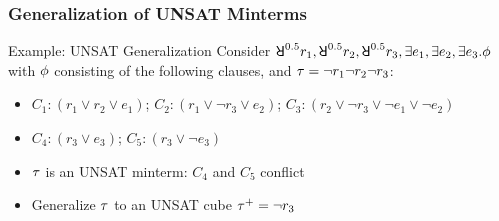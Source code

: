 \begin{frame}
    \frametitle{Generalization of UNSAT Minterms}
    \begin{block}{Example: UNSAT Generalization}
        Consider $\random{0.5}r_1,\random{0.5}r_2,\random{0.5}r_3,\exists e_1,\exists e_2,\exists e_3.\pf$ with $\phi$ consisting of the following clauses, and $\tau=\lnot r_1\lnot r_2\lnot r_3$:
        \begin{itemize}
            \item[] $C_1: (r_1 \lor r_2 \lor e_1)$; $C_2: (r_1 \lor \lnot r_3 \lor e_2)$; $C_3: (r_2 \lor \lnot r_3 \lor \lnot e_1 \lor \lnot e_2)$
            \item[] $C_4: (r_3 \lor e_3)$; $C_5: (r_3 \lor \lnot e_3)$
                  \pause
        \end{itemize}
        \begin{itemize}
            \item $\tau$ is an UNSAT minterm: $C_4$ and $C_5$ conflict
                  \pause
            \item Generalize $\tau$ to an UNSAT cube $\tau^+=\lnot r_3$
        \end{itemize}
    \end{block}
\end{frame}